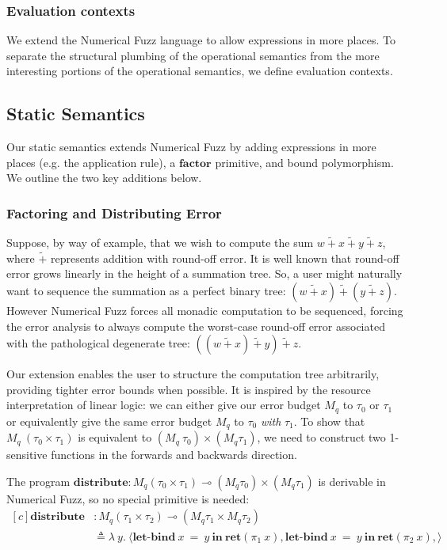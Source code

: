 \subsubsection*{Evaluation contexts}
We extend the Numerical Fuzz language to allow expressions in more places. To
separate the structural plumbing of the operational semantics from the more
interesting portions of the operational semantics, we define evaluation
contexts.



\subsection{Static Semantics} \label{sec:static-semantics}
Our static semantics extends Numerical Fuzz by adding expressions in more places
(e.g. the application rule), a $\textbf{factor}$ primitive, and bound
polymorphism. We outline the two key additions below.

\subsubsection*{Factoring and Distributing Error} \label{sec:factor}
Suppose, by way of example, that we wish to compute the sum 
$w~\tilde{+}~x~\tilde{+}~y~\tilde{+}~z$, where $\tilde{+}$ represents addition
with round-off error.
It is well known that round-off error grows linearly in the height of a
summation tree. So, a user might naturally want to sequence the summation as
a perfect binary tree: $(w~\tilde{+}~x)~\tilde{+}~(y~\tilde{+}~z)$.
However Numerical Fuzz forces all monadic computation to be sequenced, forcing
the error analysis 
to always compute the worst-case round-off error associated with the
pathological degenerate tree: $((w~\tilde{+}~x)~\tilde{+}~y)~\tilde{+}~z$.

Our extension enables the user to structure the computation tree arbitrarily,
providing tighter error bounds when possible. It is inspired by the resource
interpretation of linear logic: we can either give our error budget $M_q$ to
$\tau_0$ or $\tau_1$ or equivalently give the same error budget $M_q$ to
$\tau_0$ \textit{with} $\tau_1$. To show that $M_q ~ (\tau_0 \times \tau_1)$
is equivalent to
$(M_q ~ \tau_0) \times (M_q \tau_1)$, we need to construct two 1-sensitive
functions in the forwards and backwards direction.

The program $\textbf{distribute} : M_q (\tau_0 \times \tau_1) \multimap (M_q \tau_0)
\times (M_q \tau_1)$ is derivable in Numerical Fuzz, so no special primitive is
needed:
\begin{equation*} \label{eq:distribute}
\begin{aligned}[c]
\textbf{distribute} &: M_q (\tau_1 \times \tau_2) \multimap (M_q \tau_1 \times M_q \tau_2) \\
 & \triangleq \lambda ~ y. ~ 
   \langle
     \textbf{let-bind} \ x ~ = ~ y \ \textbf{in} \ \textbf{ret}(\pi_1 ~ x),
     \textbf{let-bind} \ x ~ = ~ y \ \textbf{in} \ \textbf{ret}(\pi_2 ~ x),
   \rangle
\end{aligned}
\end{equation*}


